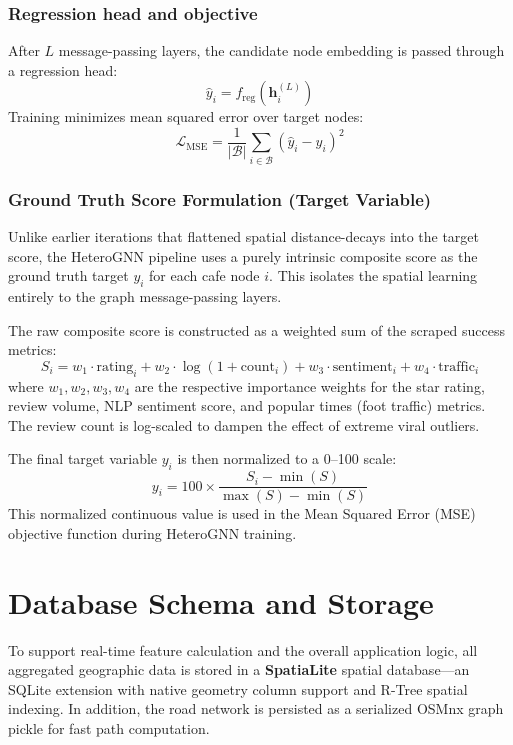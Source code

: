 \subsubsection{Regression head and objective}
After $L$ message-passing layers, the candidate node embedding is passed through a regression head:
\begin{equation}
\hat{y}_i = f_{\text{reg}}\!\left(\mathbf{h}^{(L)}_i\right)
\end{equation}
Training minimizes mean squared error over target nodes:
\begin{equation}
\mathcal{L}_{\text{MSE}} = \frac{1}{|\mathcal{B}|}\sum_{i\in\mathcal{B}}\left(\hat{y}_i - y_i\right)^2
\end{equation}

\subsubsection{Ground Truth Score Formulation (Target Variable)}
Unlike earlier iterations that flattened spatial distance-decays into the target score, the HeteroGNN pipeline uses a purely intrinsic composite score as the ground truth target $y_i$ for each cafe node $i$. This isolates the spatial learning entirely to the graph message-passing layers.

The raw composite score is constructed as a weighted sum of the scraped success metrics:
\begin{equation}
S_i = w_1 \cdot \text{rating}_i + w_2 \cdot \log(1 + \text{count}_i) + w_3 \cdot \text{sentiment}_i + w_4 \cdot \text{traffic}_i
\end{equation}
where $w_1, w_2, w_3, w_4$ are the respective importance weights for the star rating, review volume, NLP sentiment score, and popular times (foot traffic) metrics. The review count is log-scaled to dampen the effect of extreme viral outliers.

The final target variable $y_i$ is then normalized to a 0--100 scale:
\begin{equation}
y_i = 100 \times \frac{S_i - \min(S)}{\max(S) - \min(S)}
\end{equation}
This normalized continuous value is used in the Mean Squared Error (MSE) objective function during HeteroGNN training.

\section{Database Schema and Storage}

To support real-time feature calculation and the overall application logic, all aggregated geographic data is stored in a \textbf{SpatiaLite} spatial database---an SQLite extension with native geometry column support and R-Tree spatial indexing. In addition, the road network is persisted as a serialized OSMnx graph pickle for fast path computation.

